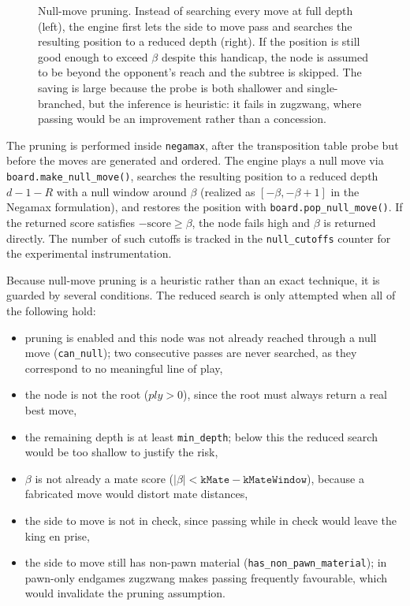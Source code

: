 \begin{figure}[ht]
\caption{Null-move pruning. Instead of searching every move at full depth (left),
the engine first lets the side to move pass and searches the resulting position
to a reduced depth (right). If the position is still good enough to exceed
$\beta$ despite this handicap, the node is assumed to be beyond the opponent's
reach and the subtree is skipped. The saving is large because the probe is both
shallower and single-branched, but the inference is heuristic: it fails in
zugzwang, where passing would be an improvement rather than a concession.}
\label{fig:nullmove}
\end{figure}

The pruning is performed inside \texttt{negamax}, after the transposition table
probe but before the moves are generated and ordered. The engine plays a null
move via \texttt{board.make\_null\_move()}, searches the resulting position to a
reduced depth $d-1-R$ with a null window around $\beta$ (realized as
$[-\beta, -\beta+1]$ in the Negamax formulation), and restores the position with
\texttt{board.pop\_null\_move()}. If the returned score satisfies
$-\text{score} \ge \beta$, the node fails high and $\beta$ is returned directly.
The number of such cutoffs is tracked in the \texttt{null\_cutoffs} counter for
the experimental instrumentation.

Because null-move pruning is a heuristic rather than an exact technique, it is
guarded by several conditions. The reduced search is only attempted when all of
the following hold:
\begin{itemize}
    \item pruning is enabled and this node was not already reached through a null
    move (\texttt{can\_null}); two consecutive passes are never searched, as they
    correspond to no meaningful line of play,
    \item the node is not the root ($ply > 0$), since the root must always return
    a real best move,
    \item the remaining depth is at least \texttt{min\_depth}; below this the
    reduced search would be too shallow to justify the risk,
    \item $\beta$ is not already a mate score
    ($|\beta| < \texttt{kMate} - \texttt{kMateWindow}$), because a fabricated
    move would distort mate distances,
    \item the side to move is not in check, since passing while in check would
    leave the king en prise,
    \item the side to move still has non-pawn material
    (\texttt{has\_non\_pawn\_material}); in pawn-only endgames zugzwang makes
    passing frequently favourable, which would invalidate the pruning assumption.
\end{itemize}

